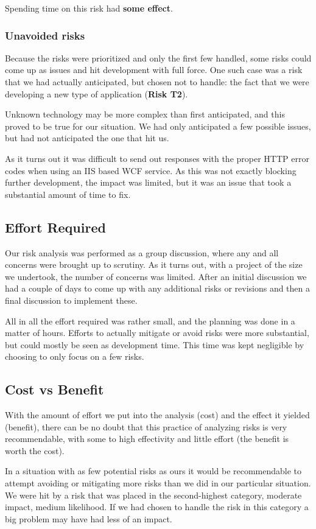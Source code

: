 Spending time on this risk had \textbf{some effect}.

\subsubsection{Unavoided risks}

Because the risks were prioritized and only the first few handled, some risks
could come up as issues and hit development with full force. One such case was a
risk that we had actually anticipated, but chosen not to handle: the fact that
we were developing a new type of application (\textbf{Risk T2}).

Unknown technology may be more complex than first anticipated, and this proved
to be true for our situation. We had only anticipated a few possible issues,
but had not anticipated the one that hit us.

As it turns out it was difficult to send out responses with the proper HTTP
error codes when using an IIS based WCF service. As this was not exactly
blocking further development, the impact was limited, but it was an issue that
took a substantial amount of time to fix.

\subsection{Effort Required}

Our risk analysis was performed as a group discussion, where any and all concerns were brought up to scrutiny.
As it turns out, with a project of the size we undertook, the number of concerns was limited. After an initial
discussion we had a couple of days to come up with any additional risks or revisions and then a final discussion
to implement these.

All in all the effort required was rather small, and the planning was done in a
matter of hours. Efforts to actually mitigate or avoid risks were more
substantial, but could mostly be seen as development time. This time was kept
negligible by choosing to only focus on a few risks.

\subsection{Cost vs Benefit}

With the amount of effort we put into the analysis (cost) and the effect it
yielded (benefit), there can be no doubt that this practice of analyzing risks
is very recommendable, with some to high effectivity and little effort (the
benefit is worth the cost).

In a situation with as few potential risks as ours it would be recommendable to
attempt avoiding or mitigating more risks than we did in our particular
situation. We were hit by a risk that was placed in the second-highest
category, moderate impact, medium likelihood. If we had chosen to handle the
risk in this category a big problem may have had less of an impact.
